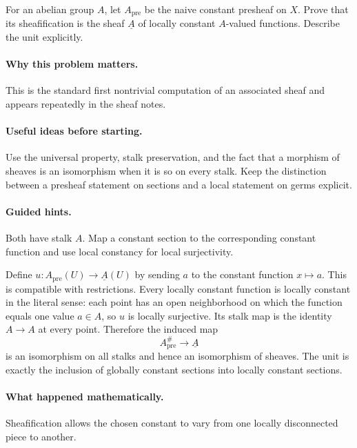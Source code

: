 \begin{problem}
For an abelian group $A$, let $A_{\mathrm{pre}}$ be the naive constant presheaf on $X$. Prove that its sheafification is the sheaf $\underline A$ of locally constant $A$-valued functions. Describe the unit explicitly.
\end{problem}

\paragraph{Why this problem matters.}
This is the standard first nontrivial computation of an associated sheaf and appears repeatedly in the sheaf notes.

\paragraph{Useful ideas before starting.}
Use the universal property, stalk preservation, and the fact that a morphism of sheaves is an isomorphism when it is so on every stalk.  Keep the distinction between a presheaf statement on sections and a local statement on germs explicit.

\paragraph{Guided hints.}
Both have stalk $A$. Map a constant section to the corresponding constant function and use local constancy for local surjectivity.

\ifdefined\FullProblemDossiers
\begin{solution}
Define $u:A_{\mathrm{pre}}(U)\to\underline A(U)$ by sending $a$ to the constant function $x\mapsto a$. This is compatible with restrictions. Every locally constant function is locally constant in the literal sense: each point has an open neighborhood on which the function equals one value $a\in A$, so $u$ is locally surjective. Its stalk map is the identity $A\to A$ at every point. Therefore the induced map
\[
A_{\mathrm{pre}}^\#\longrightarrow\underline A
\]
is an isomorphism on all stalks and hence an isomorphism of sheaves. The unit is exactly the inclusion of globally constant sections into locally constant sections.
\end{solution}

\paragraph{What happened mathematically.}
Sheafification allows the chosen constant to vary from one locally disconnected piece to another.

